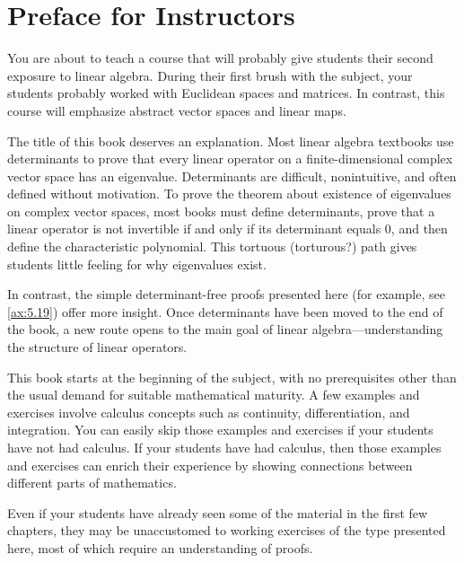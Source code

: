 \chapter*{Preface for Instructors}

You are about to teach a course that will probably give students their second
exposure to linear algebra. During their first brush with the subject, your
students probably worked with Euclidean spaces and matrices. In contrast, this
course will emphasize abstract vector spaces and linear maps.

The title of this book deserves an explanation. Most linear algebra textbooks
use determinants to prove that every linear operator on a finite-dimensional
complex vector space has an eigenvalue. Determinants are difficult,
nonintuitive, and often defined without motivation. To prove the theorem about
existence of eigenvalues on complex vector spaces, most books must define
determinants, prove that a linear operator is not invertible if and only if its
determinant equals $0$, and then define the characteristic polynomial. This
tortuous (torturous?) path gives students little feeling for why eigenvalues
exist.

In contrast, the simple determinant-free proofs presented here (for example,
see \ref{ax:5.19}) offer more insight. Once determinants have been moved to the
end of the book, a new route opens to the main goal of linear
algebra---understanding the structure of linear operators.

This book starts at the beginning of the subject, with no prerequisites other
than the usual demand for suitable mathematical maturity. A few examples and
exercises involve calculus concepts such as continuity, differentiation, and
integration. You can easily skip those examples and exercises if your students
have not had calculus. If your students have had calculus, then those examples
and exercises can enrich their experience by showing connections between
different parts of mathematics.

Even if your students have already seen some of the material in the first few
chapters, they may be unaccustomed to working exercises of the type presented
here, most of which require an understanding of proofs.

